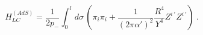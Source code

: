 \begin{equation}\label{eq:LC AdS Hamiltonian 1}
   H_{LC}^{(AdS)}= \frac{1}{2 p_-}\int_0^l d\sigma \, \left(
                     \pi_i \pi_i +
                     \frac{1}{(2\pi\alpha')^2}
                     \frac{R^4}{Y^4} Z^{i\,\prime} Z^{i\,\prime}
                     \right)\ .
\end{equation}

